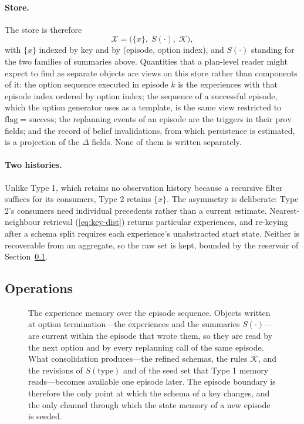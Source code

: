 \documentclass[11pt]{article}
\newcommand{\calK}{\mathcal{K}}
\newcommand{\calX}{\mathcal{X}}
\newcommand{\prov}{\mathrm{prov}}
\newcommand{\type}{\mathrm{type}}
\begin{document}
\paragraph{Store.}
The store is therefore
\begin{equation}
\calX=\big(\{x\},\;S(\cdot),\;\calK\big),
\label{eq:store2}
\end{equation}
with $\{x\}$ indexed by key and by (episode, option index), and $S(\cdot)$ standing for the two families of summaries above. Quantities that a plan-level reader might expect to find as separate objects are views on this store rather than components of it: the option sequence executed in episode $k$ is the experiences with that episode index ordered by option index; the sequence of a successful episode, which the option generator uses as a template, is the same view restricted to $\mathrm{flag}=\mathrm{success}$; the replanning events of an episode are the triggers in their $\prov$ fields; and the record of belief invalidations, from which persistence is estimated, is a projection of the $\Delta$ fields. None of them is written separately.

\paragraph{Two histories.}
Unlike Type 1, which retains no observation history because a recursive filter suffices for its consumers, Type 2 retains $\{x\}$. The asymmetry is deliberate: Type 2's consumers need individual precedents rather than a current estimate. Nearest-neighbour retrieval (\ref{eq:key-dist}) returns particular experiences, and re-keying after a schema split requires each experience's unabstracted start state. Neither is recoverable from an aggregate, so the raw set is kept, bounded by the reservoir of Section~\ref{sec:type2-ops}.

\subsection{Operations}
\label{sec:type2-ops}
\begin{figure}[t]
\centering

\caption{The experience memory over the episode sequence. Objects written at option termination---the experiences and the summaries $S(\cdot)$---are current within the episode that wrote them, so they are read by the next option and by every replanning call of the same episode. What consolidation produces---the refined schemas, the rules $\calK$, and the revisions of $S(\type)$ and of the seed set that Type 1 memory reads---becomes available one episode later. The episode boundary is therefore the only point at which the schema of a key changes, and the only channel through which the state memory of a new episode is seeded.}
\label{fig:lifecycle}
\end{figure}
\end{document}

